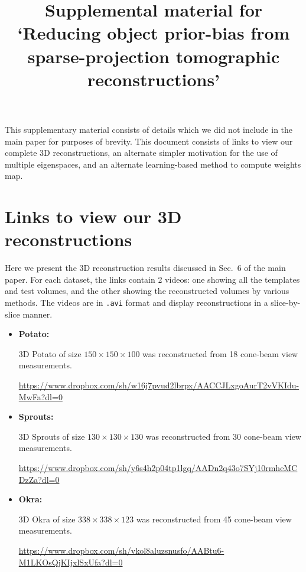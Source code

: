 \documentclass{article}
\title{Supplemental material for `Reducing object prior-bias from sparse-projection
tomographic reconstructions'}
\begin{document}
\date{}
\maketitle
This supplementary material consists of details which we did not
include in the main paper for purposes of brevity. This document
consists of links to view our complete 3D reconstructions, an
alternate simpler motivation for the use of multiple eigenspaces, and an
alternate learning-based method to compute weights map. %

\tableofcontents


\section{Links to view our 3D reconstructions}
Here we present the 3D reconstruction results discussed in Sec.~6 of
the main paper. For each dataset, the links contain 2 videos: one
showing all the templates and test volumes, and the other showing the
reconstructed volumes by various methods. The videos are in
\verb+.avi+ format and display reconstructions in a slice-by-slice
manner.

\begin{itemize}

\item \textbf{Potato:} 

    3D Potato of size $150\times 150\times 100$ was reconstructed from 18 cone-beam view measurements.

  \url{https://www.dropbox.com/sh/w16j7pvud2lbrpx/AACCJLxgoAurT2vVKIdu-MwFa?dl=0}
\item \textbf{Sprouts:}
 
    3D Sprouts of size $130\times 130\times 130$ was reconstructed from 30 cone-beam view measurements.

    \url{https://www.dropbox.com/sh/y6s4h2p04tp1lgq/AADn2q43o7SYj10rmheMCDzZa?dl=0}
 \item \textbf{Okra:}

  3D Okra of size $338\times 338\times 123$ was reconstructed from 45 cone-beam view measurements.

  \url{https://www.dropbox.com/sh/vkol8aluzsnusfo/AABtu6-M1LKOsQjKIjxlSxUfa?dl=0}
\end{itemize}
\end{document}
